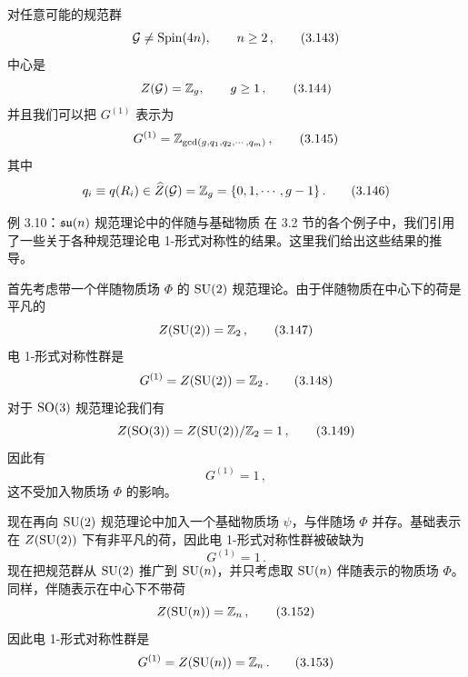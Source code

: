 
对任意可能的规范群
\begin{equation}
    \mathcal{G} \neq \mathrm{Spin}(4n), \qquad n \ge 2 \,,
    \tag{3.143}
\end{equation}
中心是
\begin{equation}
    Z(\mathcal{G}) = \mathbb{Z}_g , \qquad g \ge 1 \,,
    \tag{3.144}
\end{equation}
并且我们可以把 $G^{(1)}$ 表示为
\begin{equation}
    G^{(1)} = \mathbb{Z}_{\gcd(g,q_1,q_2,\cdots,q_m)} \,,
    \tag{3.145}
\end{equation}
其中
\begin{equation}
    q_i \equiv q(R_i) \in \widehat{Z}(\mathcal{G}) = \mathbb{Z}_g = \{0,1,\cdots,g-1\} \,.
    \tag{3.146}
\end{equation}



\begin{examplebox}{例 3.10：$\mathfrak{su}(n)$ 规范理论中的伴随与基础物质}
在 3.2 节的各个例子中，我们引用了一些关于各种规范理论电 1-形式对称性的结果。这里我们给出这些结果的推导。

首先考虑带一个伴随物质场 $\Phi$ 的 $\mathrm{SU}(2)$ 规范理论。由于伴随物质在中心下的荷是平凡的
\begin{equation}
    Z(\mathrm{SU}(2)) = \mathbb{Z}_2 \,,
    \tag{3.147}
\end{equation}
电 1-形式对称性群是
\begin{equation}
    G^{(1)} = Z(\mathrm{SU}(2)) = \mathbb{Z}_2 \,.
    \tag{3.148}
\end{equation}
对于 $\mathrm{SO}(3)$ 规范理论我们有
\begin{equation}
    Z(\mathrm{SO}(3)) = Z(\mathrm{SU}(2))/\mathbb{Z}_2 = 1 \,,
    \tag{3.149}
\end{equation}
因此有
\begin{equation}
    G^{(1)} = 1 \,,
    \tag{3.150}
\end{equation}
这不受加入物质场 $\Phi$ 的影响。

现在再向 $\mathrm{SU}(2)$ 规范理论中加入一个基础物质场 $\psi$，与伴随场 $\Phi$ 并存。基础表示在 $Z(\mathrm{SU}(2))$ 下有非平凡的荷，因此电 1-形式对称性群被破缺为
\begin{equation}
    G^{(1)} = 1 \,.
    \tag{3.151}
\end{equation}
现在把规范群从 $\mathrm{SU}(2)$ 推广到 $\mathrm{SU}(n)$，并只考虑取 $\mathrm{SU}(n)$ 伴随表示的物质场 $\Phi$。同样，伴随表示在中心下不带荷
\begin{equation}
    Z(\mathrm{SU}(n)) = \mathbb{Z}_n \,,
    \tag{3.152}
\end{equation}
因此电 1-形式对称性群是
\begin{equation}
    G^{(1)} = Z(\mathrm{SU}(n)) = \mathbb{Z}_n \,.
    \tag{3.153}
\end{equation}
\end{examplebox}

